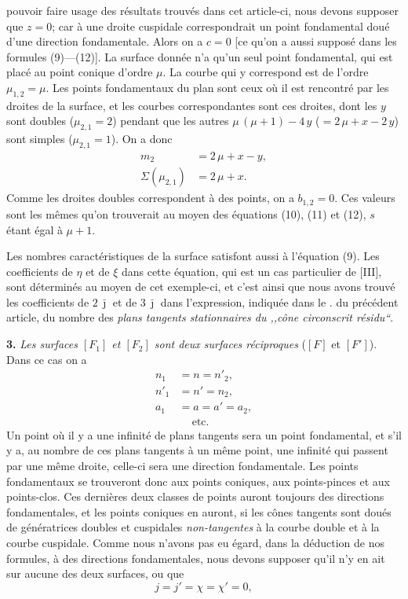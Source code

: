 \documentclass{article}
\begin{document}
pouvoir faire usage des résultats trouvés dans cet article-ci, nous devons supposer que $z = 0$; car à une droite cuspidale correspondrait un point fondamental doué d'une direction fondamentale. Alors on a $c = 0$ [ce qu'on a aussi supposé dans les formules (9)---(12)]. La surface donnée n'a qu'un seul point fondamental, qui est placé au point conique d'ordre $\mu$. La courbe qui y correspond est de l'ordre $\mu_{1, 2} = \mu$. Les points fondamentaux du plan sont ceux où il est rencontré par les droites de la surface, et les courbes correspondantes sont ces droites, dont les $y$ sont doubles ($\mu_{2, 1} = 2$) pendant que les autres $\mu\,(\mu + 1) - 4\,y$ ($= 2\,\mu + x - 2\,y$) sont simples ($\mu_{2, 1} = 1$). On a donc
\[
\begin{aligned}
m_2 &= 2\,\mu + x - y, \\
\Sigma(\mu_{2, 1}) &= 2\,\mu + x.
\end{aligned}
\]
Comme les droites doubles correspondent à des points, on a $b_{1, 2} = 0$. Ces valeurs sont les mêmes qu'on trouverait au moyen des équations (10), (11) et (12), $s$ étant égal à $\mu + 1$.

Les nombres caractéristiques de la surface satisfont aussi à l'équation (9). Les coefficients de $\eta$ et de $\xi$ dans cette équation, qui est un cas particulier de [III], sont déterminés au moyen de cet exemple-ci, et c'est ainsi que nous avons trouvé les coefficients de $2\,\bar{\jmath}$ et de $3\,\bar{\jmath}$ dans l'expression, indiquée dans le . du précédent article, du nombre des \emph{plans tangents stationnaires du ,,cône circonscrit résidu``}.

\textbf{3.} \emph{Les surfaces $[F_1]$ et $[F_2]$ sont deux surfaces réciproques} ($[F]$ et $[F']$). Dans ce cas on a
\[
\begin{aligned}
n_1 &= n = n'_2, \\
n'_1 &= n' = n_2, \\
a_1 &= a = a' = a_2, \\
&\quad\ \text{etc.}
\end{aligned}
\]
Un point où il y a une infinité de plans tangents sera un point fondamental, et s'il y a, au nombre de ces plans tangents à un même point, une infinité qui passent par une même droite, celle-ci sera une direction fondamentale. Les points fondamentaux se trouveront donc aux points coniques, aux points-pinces et aux points-clos. Ces dernières deux classes de points auront toujours des directions fondamentales, et les points coniques en auront, si les cônes tangents sont doués de génératrices doubles et cuspidales \emph{non-tangentes} à la courbe double et à la courbe cuspidale. Comme nous n'avons pas eu égard, dans la déduction de nos formules, à des directions fondamentales, nous devons supposer qu'il n'y en ait sur aucune des deux surfaces, ou que
\[
j = j' = \chi = \chi' = 0,
\]
\end{document}
